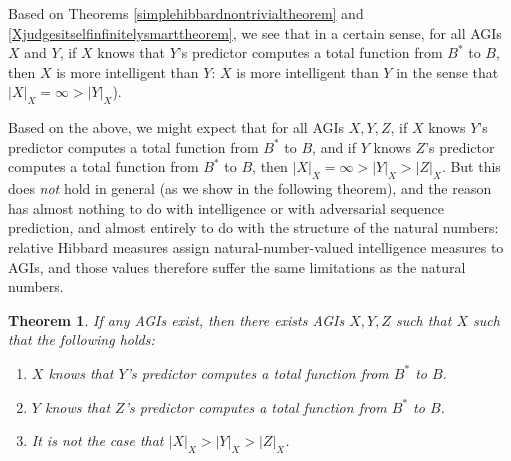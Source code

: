 \documentclass{article}
\newtheorem{theorem}{Theorem}
\begin{document}
Based on Theorems \ref{simplehibbardnontrivialtheorem}
and \ref{Xjudgesitselfinfinitelysmarttheorem},
we see that in a certain sense, for all AGIs $X$ and $Y$,
if $X$ knows that $Y$'s predictor computes a total function from $B^*$ to $B$,
then $X$ is more intelligent than $Y$: $X$ is more intelligent
than $Y$ in the sense that $|X|_X=\infty>|Y|_X$).

Based on the above, we might expect that for all AGIs $X,Y,Z$, if $X$ knows
$Y$'s predictor computes a total function from $B^*$ to $B$, and if $Y$
knows $Z$'s predictor computes a total function from $B^*$ to $B$,
then $|X|_X=\infty>|Y|_X>|Z|_X$. But this does \emph{not} hold in general
(as we show in the following theorem),
and the reason has almost nothing to do with intelligence or with adversarial
sequence prediction, and almost entirely to do with the structure of the natural
numbers: relative Hibbard measures assign natural-number-valued intelligence
measures to AGIs, and those values therefore suffer the same limitations as the
natural numbers.

\begin{theorem}
\label{nonarchimedeantheorem}
    If any AGIs exist, then
    there exists AGIs $X,Y,Z$ such that $X$ such that the following holds:
    \begin{enumerate}
        \item $X$ knows that $Y$'s predictor computes a total function from $B^*$ to $B$.
        \item $Y$ knows that $Z$'s predictor computes a total function from $B^*$ to $B$.
        \item It is \emph{not} the case that $|X|_X>|Y|_X>|Z|_X$.
    \end{enumerate}
\end{theorem}
\end{document}
